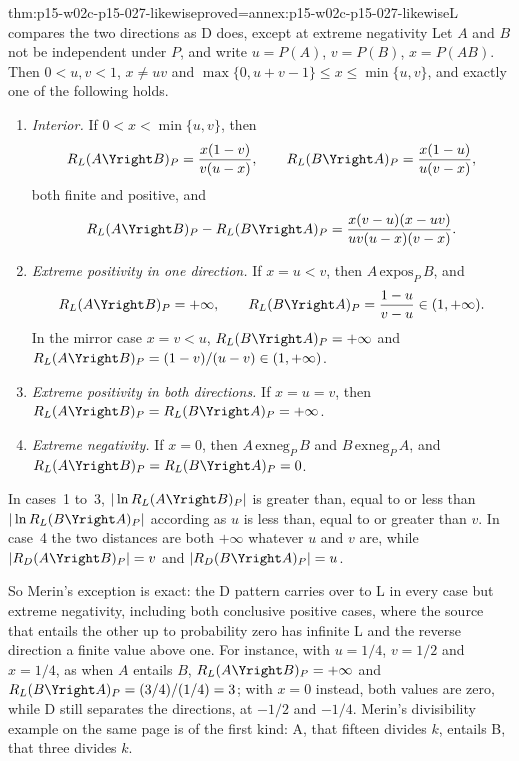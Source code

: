 \begin{hbtheorem}{thm:p15-w02c-p15-027-likewise}{proved=annex:p15-w02c-p15-027-likewise}{L compares the two directions as D does, except at extreme negativity}
Let \(A\) and \(B\) not be independent under \(P\), and write
\(u=P(A)\), \(v=P(B)\), \(x=P(AB)\). Then \(0<u,v<1\),
\(x\ne uv\) and \(\max\{0,u+v-1\}\leq x\leq\min\{u,v\}\), and exactly
one of the following holds.
\begin{enumerate}
\item \emph{Interior.} If \(0<x<\min\{u,v\}\), then
  \[
   R_L(A\Yright B)_P=\frac{x(1-v)}{v(u-x)},\qquad
   R_L(B\Yright A)_P=\frac{x(1-u)}{u(v-x)},
  \]
  both finite and positive, and
  \[
   R_L(A\Yright B)_P-R_L(B\Yright A)_P=\frac{x(v-u)(x-uv)}{uv(u-x)(v-x)}.
  \]
\item \emph{Extreme positivity in one direction.} If \(x=u<v\), then
  \(A\,\mathrm{expos}_P\,B\), and
  \[
   R_L(A\Yright B)_P=+\infty,\qquad
   R_L(B\Yright A)_P=\frac{1-u}{v-u}\in(1,+\infty).
  \]
  In the mirror case \(x=v<u\), \(R_L(B\Yright A)_P=+\infty\) and
  \(R_L(A\Yright B)_P=(1-v)/(u-v)\in(1,+\infty)\).
\item \emph{Extreme positivity in both directions.} If \(x=u=v\), then
  \(R_L(A\Yright B)_P=R_L(B\Yright A)_P=+\infty\).
\item \emph{Extreme negativity.} If \(x=0\), then \(A\,\mathrm{exneg}_P\,B\)
  and \(B\,\mathrm{exneg}_P\,A\), and
  \(R_L(A\Yright B)_P=R_L(B\Yright A)_P=0\).
\end{enumerate}
In cases~1 to~3,
\(|\ln R_L(A\Yright B)_P|\) is greater than, equal to or less than
\(|\ln R_L(B\Yright A)_P|\) according as \(u\) is less than, equal to or
greater than \(v\). In case~4 the two distances are both \(+\infty\)
whatever \(u\) and \(v\) are, while
\(|R_D(A\Yright B)_P|=v\) and \(|R_D(B\Yright A)_P|=u\).
\end{hbtheorem}

So Merin's exception is exact: the D pattern carries over to L in every
case but extreme negativity, including both conclusive positive cases,
where the source that entails the other up to probability zero has
infinite L and the reverse direction a finite value above one. For
instance, with \(u=1/4\), \(v=1/2\) and \(x=1/4\), as when \(A\) entails
\(B\), \(R_L(A\Yright B)_P=+\infty\) and
\(R_L(B\Yright A)_P=(3/4)/(1/4)=3\); with \(x=0\) instead, both values
are zero, while D still separates the directions, at \(-1/2\) and
\(-1/4\). Merin's divisibility example on the same page is of the first
kind: A, that fifteen divides \(k\), entails B, that three divides
\(k\).

